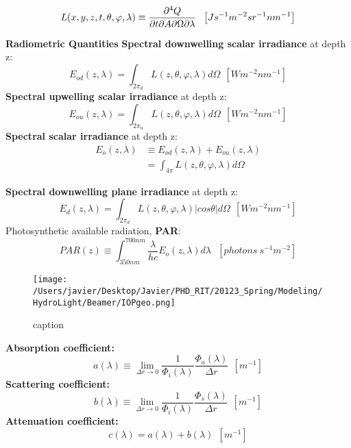\begin{equation}
	\small L(x,y,z,t,\theta,\varphi,\lambda)\equiv\frac{\partial^4 Q}{\partial t\partial A\partial\Omega\partial\lambda}~~\left[ Js^{-1}m^{-2}sr^{-1}nm^{-1} \right]
\end{equation}


{\bf Radiometric Quantities}
\textbf{Spectral downwelling scalar irradiance} at depth z:
\begin{equation}
	E_{od}(z,\lambda)=\int_{2\pi_d} L(z,\theta,\varphi,\lambda)d\Omega~~\left[Wm^{-2}nm^{-1} \right]
\end{equation}
\textbf{Spectral upwelling scalar irradiance} at depth z:
\begin{equation}
	E_{ou}(z,\lambda)=\int_{2\pi_u} L(z,\theta,\varphi,\lambda)d\Omega~~\left[Wm^{-2}nm^{-1} \right]
\end{equation}
\textbf{Spectral scalar irradiance} at depth z:
\begin{align}
	E_{o}(z,\lambda) &\equiv E_{od}(z,\lambda)+E_{ou}(z,\lambda)\\
					 &=\int_{4\pi} L(z,\theta,\varphi,\lambda)d\Omega
\end{align}

\textbf{Spectral downwelling plane irradiance} at depth z:
\begin{equation}
	E_{d}(z,\lambda)=\int_{2\pi_d} L(z,\theta,\varphi,\lambda)|cos\theta|d\Omega~~\left[Wm^{-2}nm^{-1} \right]
\end{equation}
Photosynthetic available radiation, \textbf{PAR}:
\begin{equation}
	PAR(z)\equiv \int_{350nm}^{700nm} \frac{\lambda}{hc}E_o(z,\lambda)d\lambda~~~\left[photons~s^{-1}m^{-2} \right]
\end{equation}

		\begin{figure}[H]
		\centering
		\texttt{[image: /Users/javier/Desktop/Javier/PHD\_RIT/20123\_Spring/Modeling/HydroLight/Beamer/IOPgeo.png]}
		\caption{caption \label{label} } 
		\end{figure}

		\textbf{Absorption coefficient:}
		\begin{equation}
			a(\lambda)\equiv \lim_{\Delta r\to 0} \frac{1}{\Phi_i(\lambda)}\frac{\Phi_a(\lambda)}{\Delta r}~~\left[m^{-1} \right]
		\end{equation}
		\textbf{Scattering coefficient:}
		\begin{equation}
			b(\lambda)\equiv \lim_{\Delta r\to 0} \frac{1}{\Phi_i(\lambda)}\frac{\Phi_s(\lambda)}{\Delta r}~~\left[m^{-1} \right]
		\end{equation}
		\textbf{Attenuation coefficient:}
		\begin{equation}
			c(\lambda)=a(\lambda)+b(\lambda)~~\left[m^{-1} \right]
		\end{equation}

